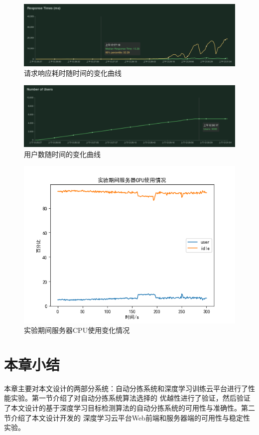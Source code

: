 \begin{figure}[h]
    \centering
    \includegraphics[width=\textwidth]{pic/chap5/rt.png}
    \caption{请求响应耗时随时间的变化曲线}
    \label{fig:locust:rt}
\end{figure}

\begin{figure}[h]
    \centering
    \includegraphics[width=\textwidth]{pic/chap5/user_numbers.png}
    \caption{用户数随时间的变化曲线}
    \label{fig:locust:user}
\end{figure}

\begin{figure}[h]
    \centering
    \includegraphics[width=\textwidth]{pic/chap5/server_cpu.png}
    \caption{实验期间服务器CPU使用变化情况}
    \label{fig:server:cpu}
\end{figure}


\section{本章小结}

本章主要对本文设计的两部分系统：自动分拣系统和深度学习训练云平台进行了性能实验。第一节介绍了对自动分拣系统算法选择的
优越性进行了验证，然后验证了本文设计的基于深度学习目标检测算法的自动分拣系统的可用性与准确性。第二节介绍了本文设计开发的
深度学习云平台Web前端和服务器端的可用性与稳定性实验。